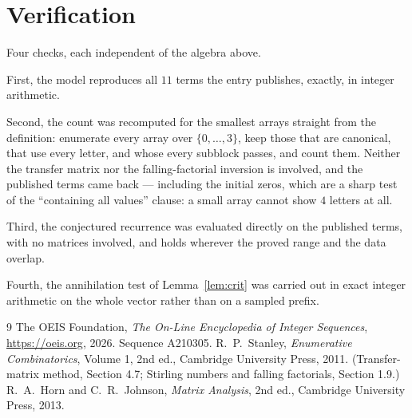 \documentclass[11pt,a4paper]{article}
\theoremstyle{plain}
\theoremstyle{definition}
\begin{document}
\section{Verification}

Four checks, each independent of the algebra above.

First, the model reproduces all $11$ terms the entry publishes, exactly, in integer
arithmetic.

Second, the count was recomputed for the smallest arrays straight from the definition:
enumerate every array over $\{0,\dots,3\}$, keep those that are canonical, that use every
letter, and whose every subblock passes, and count them. Neither the transfer matrix nor the
falling-factorial inversion is involved, and the published terms came back --- including the
initial zeros, which are a sharp test of the ``containing all values'' clause: a small array
cannot show $4$ letters at all.

Third, the conjectured recurrence was evaluated directly on the published terms, with no
matrices involved, and holds wherever the proved range and the data overlap.

Fourth, the annihilation test of Lemma~\ref{lem:crit} was carried out in exact integer
arithmetic on the whole vector rather than on a sampled prefix.

\begin{thebibliography}{9}
 The OEIS Foundation, \emph{The On-Line Encyclopedia of Integer
Sequences}, \url{https://oeis.org}, 2026. Sequence A210305.
 R.~P.~Stanley, \emph{Enumerative Combinatorics}, Volume 1, 2nd ed.,
Cambridge University Press, 2011. (Transfer-matrix method, Section 4.7; Stirling numbers and
falling factorials, Section 1.9.)
 R.~A.~Horn and C.~R.~Johnson, \emph{Matrix Analysis}, 2nd ed., Cambridge
University Press, 2013.
\end{thebibliography}
\end{document}
